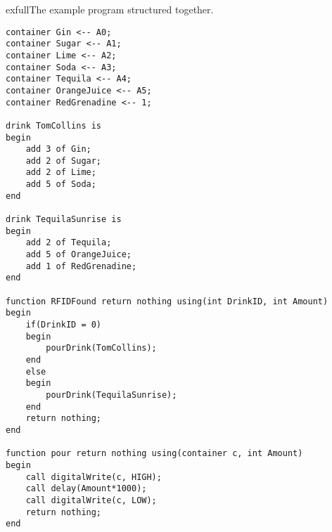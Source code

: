 \begin{code}{exfull}{The example program structured together.}
\begin{lstlisting}
container Gin <-- A0;
container Sugar <-- A1;
container Lime <-- A2;
container Soda <-- A3;
container Tequila <-- A4;
container OrangeJuice <-- A5;
container RedGrenadine <-- 1;

drink TomCollins is
begin
	add 3 of Gin;
	add 2 of Sugar;
	add 2 of Lime;
	add 5 of Soda;
end

drink TequilaSunrise is 
begin
	add 2 of Tequila;
	add 5 of OrangeJuice;
	add 1 of RedGrenadine;
end

function RFIDFound return nothing using(int DrinkID, int Amount)
begin
	if(DrinkID = 0)
	begin
		pourDrink(TomCollins);
	end
	else
	begin
		pourDrink(TequilaSunrise);
	end
	return nothing;
end

function pour return nothing using(container c, int Amount)
begin
	call digitalWrite(c, HIGH);
	call delay(Amount*1000);
	call digitalWrite(c, LOW);
	return nothing;
end
\end{lstlisting}
\end{code}